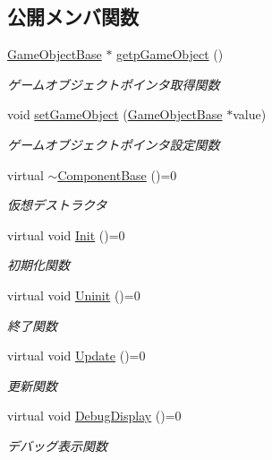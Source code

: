 \subsection*{公開メンバ関数}
\begin{DoxyCompactItemize}
\item 
\mbox{\hyperlink{class_game_object_base}{Game\+Object\+Base}} $\ast$ \mbox{\hyperlink{class_component_base_ab9517b92e45e084b1cc450c147e16642}{getp\+Game\+Object}} ()
\begin{DoxyCompactList}\small\item\em ゲームオブジェクトポインタ取得関数 \end{DoxyCompactList}\item 
void \mbox{\hyperlink{class_component_base_ae671317076d3c89ba0793ae2cd34d5ea}{set\+Game\+Object}} (\mbox{\hyperlink{class_game_object_base}{Game\+Object\+Base}} $\ast$value)
\begin{DoxyCompactList}\small\item\em ゲームオブジェクトポインタ設定関数 \end{DoxyCompactList}\item 
virtual \mbox{\hyperlink{class_component_base_a80a37e33ecca2471b2186fba1aaf2cdd}{$\sim$\+Component\+Base}} ()=0
\begin{DoxyCompactList}\small\item\em 仮想デストラクタ \end{DoxyCompactList}\item 
virtual void \mbox{\hyperlink{class_component_base_a125939d6befe42f28886a6523e86b18b}{Init}} ()=0
\begin{DoxyCompactList}\small\item\em 初期化関数 \end{DoxyCompactList}\item 
virtual void \mbox{\hyperlink{class_component_base_a9f42beaf0383d6f629819579cab4de57}{Uninit}} ()=0
\begin{DoxyCompactList}\small\item\em 終了関数 \end{DoxyCompactList}\item 
virtual void \mbox{\hyperlink{class_component_base_a58e66d65bc8f3cd5ab67b4b2deab4fc2}{Update}} ()=0
\begin{DoxyCompactList}\small\item\em 更新関数 \end{DoxyCompactList}\item 
virtual void \mbox{\hyperlink{class_component_base_a36ae7d27ad9d756fa245bad443020407}{Debug\+Display}} ()=0
\begin{DoxyCompactList}\small\item\em デバッグ表示関数 \end{DoxyCompactList}\end{DoxyCompactItemize}
